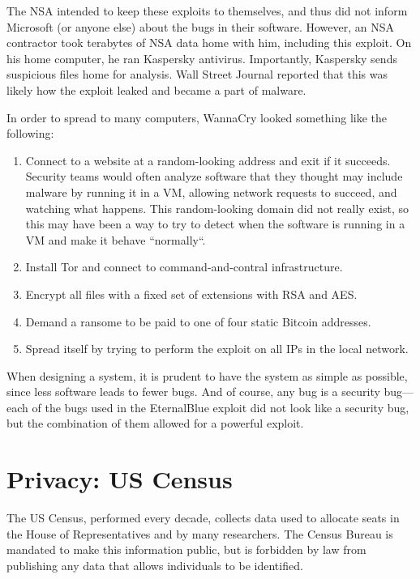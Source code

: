 \documentclass[
  letterpaper,
]{scrbook}
\providecommand{\tightlist}{%
  \setlength{\itemsep}{0pt}\setlength{\parskip}{0pt}}
\theoremstyle{definition}
\theoremstyle{plain}
\theoremstyle{plain}
\theoremstyle{remark}
\begin{document}
The NSA intended to keep these exploits to themselves, and thus did not
inform Microsoft (or anyone else) about the bugs in their software.
However, an NSA contractor took terabytes of NSA data home with him,
including this exploit. On his home computer, he ran Kaspersky
antivirus. Importantly, Kaspersky sends suspicious files home for
analysis. Wall Street Journal reported that this was likely how the
exploit leaked and became a part of malware.

In order to spread to many computers, WannaCry looked something like the
following:

\begin{enumerate}
\def\labelenumi{\arabic{enumi}.}
\tightlist
\item
  Connect to a website at a random-looking address and exit if it
  succeeds. Security teams would often analyze software that they
  thought may include malware by running it in a VM, allowing network
  requests to succeed, and watching what happens. This random-looking
  domain did not really exist, so this may have been a way to try to
  detect when the software is running in a VM and make it behave
  ``normally``.
\item
  Install Tor and connect to command-and-contral infrastructure.
\item
  Encrypt all files with a fixed set of extensions with RSA and AES.
\item
  Demand a ransome to be paid to one of four static Bitcoin addresses.
\item
  Spread itself by trying to perform the exploit on all IPs in the local
  network.
\end{enumerate}

When designing a system, it is prudent to have the system as simple as
possible, since less software leads to fewer bugs. And of course, any
bug is a security bug---each of the bugs used in the EternalBlue exploit
did not look like a security bug, but the combination of them allowed
for a powerful exploit.

\section{Privacy: US Census}\label{privacy-us-census}

The US Census, performed every decade, collects data used to allocate
seats in the House of Representatives and by many researchers. The
Census Bureau is mandated to make this information public, but is
forbidden by law from publishing any data that allows individuals to be
identified.
\end{document}
